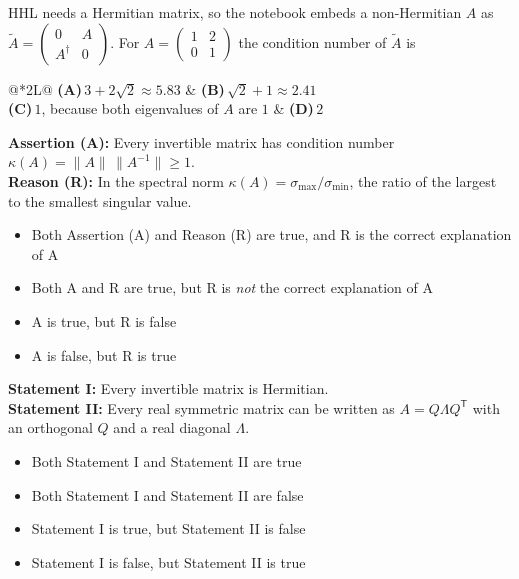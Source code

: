 \documentclass[11pt,a4paper]{article}
\newcommand{\optlabel}[1]{\textbf{(#1)}}
\newenvironment{qitem}[1]{\begin{list}{}{\setlength{\leftmargin}{3.3em}\setlength{\labelwidth}{3.1em}%
  \setlength{\labelsep}{0.2em}\setlength{\topsep}{3pt}\setlength{\parsep}{3pt}}\item[\textbf{Q.#1}\hfill]}{\end{list}}
\newcommand{\qsep}{\par\vspace{2pt}{\color{black!15}\hrule}\vspace{4pt}}
\begin{document}
\begin{qitem}{6}
HHL needs a Hermitian matrix, so the notebook embeds a non-Hermitian $A$ as $\tilde A = \begin{pmatrix}0 & A\\ A^\dagger & 0\end{pmatrix}$. For $A = \begin{pmatrix}1 & 2\\ 0 & 1\end{pmatrix}$ the
condition number of $\tilde A$ is
\par\smallskip\noindent\begin{tabularx}{\linewidth}{@{}*{2}{L}@{}}
\optlabel{A}\,$3 + 2\sqrt2 \approx 5.83$ & \optlabel{B}\,$\sqrt2 + 1 \approx 2.41$ \\[3pt]
\optlabel{C}\,$1$, because both eigenvalues of $A$ are $1$ & \optlabel{D}\,$2$
\end{tabularx}
\end{qitem}
\qsep

\begin{qitem}{7}
\textbf{Assertion (A):} Every invertible matrix has condition number $\kappa(A) = \|A\|\,\|A^{-1}\| \ge 1$.\\[1mm]
\textbf{Reason (R):} In the spectral norm $\kappa(A) = \sigma_{\max}/\sigma_{\min}$, the ratio of the largest to the smallest singular value.
\begin{itemize}[leftmargin=2.6em, labelsep=0.4em, itemsep=2pt, topsep=3pt]
\item[\optlabel{A}] Both Assertion (A) and Reason (R) are true, and R is the correct explanation of A
\item[\optlabel{B}] Both A and R are true, but R is \emph{not} the correct explanation of A
\item[\optlabel{C}] A is true, but R is false
\item[\optlabel{D}] A is false, but R is true
\end{itemize}
\end{qitem}
\qsep

\begin{qitem}{8}
\textbf{Statement I:} Every invertible matrix is Hermitian.\\[1mm]
\textbf{Statement II:} Every real symmetric matrix can be written as $A = Q\Lambda Q^{\mathsf T}$ with an orthogonal $Q$ and a real diagonal $\Lambda$.
\begin{itemize}[leftmargin=2.6em, labelsep=0.4em, itemsep=2pt, topsep=3pt]
\item[\optlabel{A}] Both Statement I and Statement II are true
\item[\optlabel{B}] Both Statement I and Statement II are false
\item[\optlabel{C}] Statement I is true, but Statement II is false
\item[\optlabel{D}] Statement I is false, but Statement II is true
\end{itemize}
\end{qitem}
\qsep
\end{document}
